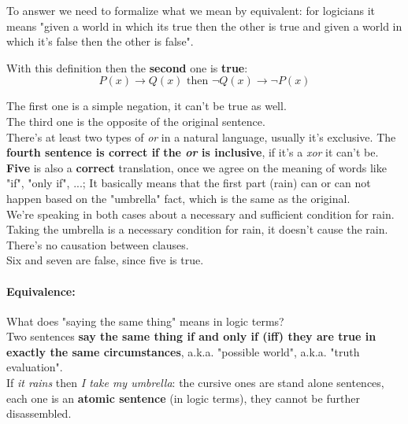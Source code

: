 \documentclass[11pt]{article}
\begin{document}
	To answer we need to formalize what we mean by equivalent: for logicians it means "given a world in which its true then the other is true and given a world in which it's false then the other is false". \\
	
	\newpage
	
	With this definition then the \textbf{second} one is \textbf{true}: 
	$$ P(x) \rightarrow Q(x) \text{ then } \neg Q(x) \rightarrow \neg P(x) $$
	
	The first one is a simple negation, it can't be true as well. \\
	
	The third one is the opposite of the original sentence. \\
	
	There's at least two types of \textit{or} in a natural language, usually it's exclusive. The \textbf{fourth sentence is correct if the \textit{or} is inclusive}, if it's a \textit{xor} it can't be. \\
	
	\textbf{Five} is also a \textbf{correct} translation, once we agree on the meaning of words like "if", "only if", ...; It basically means that the first part (rain) can or can not happen based on the "umbrella" fact, which is the same as the original. \\
	We're speaking in both cases about a necessary and sufficient condition for rain. Taking the umbrella is a necessary condition for rain, it doesn't cause the rain. There's no causation between clauses. \\
	
	Six and seven are false, since five is true. \\
	
	
	\paragraph{Equivalence:} What does "saying the same thing" means in logic terms? \\
	Two sentences \textbf{say the same thing if and only if (iff) they are true in exactly the same circumstances}, a.k.a. "possible world", a.k.a. "truth evaluation". \\
	
	If \textit{it rains} then \textit{I take my umbrella}: the cursive ones are stand alone sentences, each one is an \textbf{atomic sentence} (in logic terms), they cannot be further disassembled. \\
	
\end{document}
